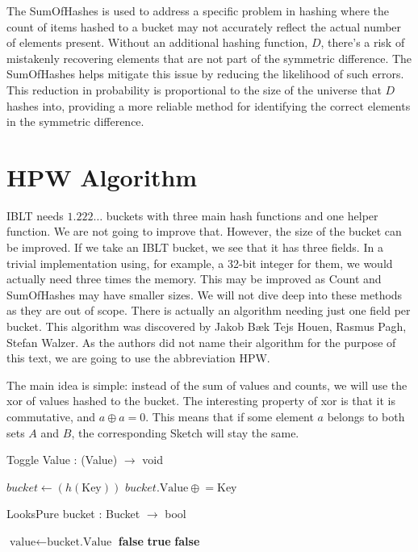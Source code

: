The SumOfHashes is used to address a specific problem in hashing where the count of items hashed to a bucket may not accurately reflect the actual number of elements present. Without an additional hashing function, \( D \), there's a risk of mistakenly recovering elements that are not part of the symmetric difference. The SumOfHashes helps mitigate this issue by reducing the likelihood of such errors. This reduction in probability is proportional to the size of the universe that \( D \) hashes into, providing a more reliable method for identifying the correct elements in the symmetric difference.

\section{HPW Algorithm} \label{hwp}
IBLT needs $1.222\dots$ buckets with three main hash functions and one helper function. We are not going to improve that. However, the size of the bucket can be improved. If we take an IBLT bucket, we see that it has three fields. In a trivial implementation using, for example, a 32-bit integer for them, we would actually need three times the memory. This may be improved as Count and SumOfHashes may have smaller sizes. We will not dive deep into these methods as they are out of scope. There is actually an algorithm needing just one field per bucket. This algorithm was discovered by Jakob Bæk Tejs Houen,
Rasmus Pagh, 
Stefan Walzer. \cite{doi:10.1137/1.9781611977585.ch21} As the authors did not name their algorithm for the purpose of this text, we are going to use the abbreviation HPW. 

The main idea is simple: instead of the sum of values and counts, we will use the xor of values hashed to the bucket. The interesting property of xor is that it is commutative, and $ a\oplus a = 0$. This means that if some element $a$ belongs to both sets $A$ and $B$, the corresponding Sketch will stay the same.

\begin{algorithm}
\caption{Toggle Value : (Value) $\to$ void}
\begin{algorithmic}[1]
        \State $bucket \gets (h(\text{Key}))$
        \State $bucket.\text{Value} \mathrel{\oplus}= \text{Key}$
    \EndFor
\EndProcedure
\end{algorithmic}
\end{algorithm}

\begin{algorithm}
\caption{LooksPure bucket : Bucket $\to$ bool}
\begin{algorithmic}[1]
    \State $\text{value} \gets \text{bucket.Value}$
        \State \Return \textbf{false}
    \EndIf
            \State \Return \textbf{true}
        \EndIf
    \EndFor
    \State \Return \textbf{false}
\EndFunction
\end{algorithmic}
\end{algorithm}

